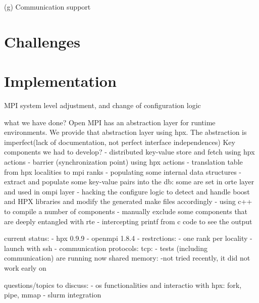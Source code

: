   (g) Communication support

\section{Challenges}
\label{sec:challenges}




\section{Implementation}
\label{sec:implementation}
MPI system level adjustment, and change of configuration logic

what we have done?
Open MPI has an abstraction layer for runtime environments.
We provide that abstraction layer using hpx.
The abstraction is imperfect(lack of documentation,
not perfect interface independences)
Key components we had to develop?
- distributed key-value store and fetch using hpx actions
- barrier (synchronization point) using hpx actions
- translation table from hpx localities to mpi ranks
- populating some internal data structures
- extract and populate some key-value pairs into the db:
some are set in orte layer and used in ompi layer
- hacking the configure logic to detect and handle boost and HPX libraries
and modify the generated make files accordingly
- using c++ to compile a number of components
- manually exclude some components that are deeply entangled with rte
- intercepting printf from c code to see the output


current status:
- hpx 0.9.9
- openmpi 1.8.4
- restrctions: - one rank per locality
- launch with ssh
- communication protocols:
tcp: - tests (including communication) are running now
shared memory: -not tried recently, it did not work early on

questions/topics to discuss:
- os functionalities and interactio with hpx: fork, pipe, mmap
- slurm integration

\fi
